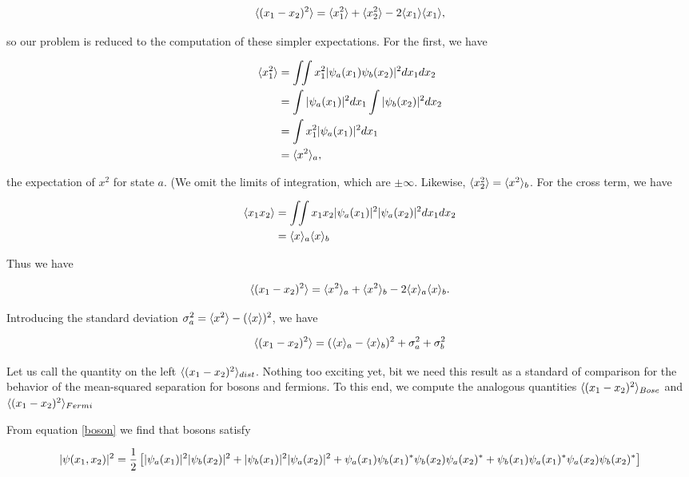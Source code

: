 \begin{equation}
\langle (x_1 - x_2)^2 \rangle
  = \langle x_1^2 \rangle
 + \langle x_2^2 \rangle
 - 2 \langle x_1 \rangle\langle x_1 \rangle,
\end{equation}

so our problem is reduced to the computation of these simpler expectations.  For the first, we have

\begin{align}
\langle x_1^2 \rangle
&= \int\kern-4pt\int x_1^2 |\psi_a(x_1)\psi_b(x_2)|^2 dx_1 dx_2 \\
&= \int |\psi_a(x_1)|^2 dx_1 \int |\psi_b(x_2)|^2  dx_2\\
&= \int x_1^2 |\psi_a(x_1)|^2 dx_1 \\
&= \langle x^2 \rangle_a,
\end{align}

the expectation of $x^2$ for state $a$.  (We omit the limits of integration, which are $\pm \infty$.
Likewise, $\langle x_2^2 \rangle = \langle x^2 \rangle_b$.  For the cross term, we have

\begin{align}
\langle x_1x_2 \rangle &= \int\kern-4pt\int x_1x_2 |\psi_a(x_1)|^2 |\psi_a(x_2)|^2 dx_1 dx_2 \\
&= \langle x \rangle_a \langle x \rangle_b
\end{align}

Thus we have

\begin{equation}
\langle (x_1 - x_2)^2 \rangle = \langle x^2 \rangle_a +  \langle x^2 \rangle_b - 2 \langle x \rangle_a \langle x \rangle_b .
\end{equation}

Introducing the standard deviation $\sigma_a^2 = \langle x^2 \rangle - (\langle x \rangle)^2$, we have

\begin{equation}
\langle (x_1 - x_2)^2 \rangle = (\langle x \rangle_a - \langle x \rangle_b)^2 + \sigma_a^2 + \sigma_b^2
\end{equation}

Let us call the quantity on the left $\langle (x_1 - x_2)^2 \rangle_{dist}$.
Nothing too exciting yet, bit we need this result as a standard of comparison for the behavior of the mean-squared separation for bosons and fermions.  To this end, we compute the analogous quantities
$\langle (x_1 - x_2)^2 \rangle_{Bose}$ and $\langle (x_1 - x_2)^2 \rangle_{Fermi}$

From equation  \eqref{boson} we find that bosons satisfy

\begin{equation}
|\psi(x_1,x_2)|^2 = \frac{1}{2}\left[   |\psi_a(x_1)|^2  |\psi_b(x_2)|^2
+ |\psi_b(x_1)|^2  |\psi_a(x_2)|^2 \\
+ \psi_a(x_1)\psi_b(x_1)^*\psi_b(x_2)\psi_a(x_2)^* \\
+ \psi_b(x_1)\psi_a(x_1)^*\psi_a(x_2)\psi_b(x_2)^* \right]
\end{equation}

